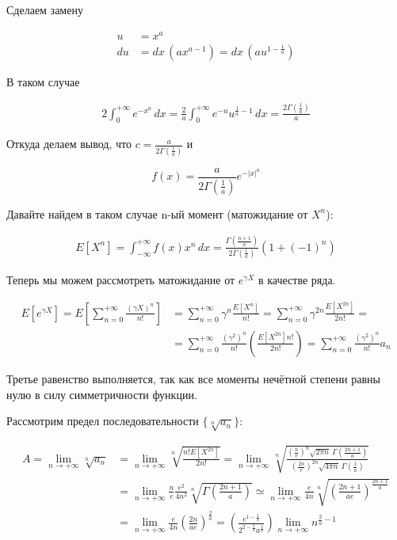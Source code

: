 \documentclass[12pt, a4paper]{article}
\theoremstyle{remark}
\newcommand{\expx}[1]{e^{-|x|^{#1}}}
\newcommand{\expxpoz}[1]{e^{-x^{#1}}}
\newcommand{\infint}[1]{\int_{-\infty}^{+\infty} #1 \, dx}
\newcommand{\infintpoz}[1]{\int_{0}^{+\infty} #1 \, dx}
\begin{document}
Сделаем замену

\begin{align*}
    u &= x^a \\
    du &= dx\,(a x^{a - 1}) = dx\,(a u^{1 - \frac{1}{a}})
\end{align*}

В таком случае

\begin{align*}
    2\infintpoz{\expxpoz{a}} = \frac{2}{a} \infintpoz{e^{-u}u^{\frac{1}{a} - 1}} = \frac{2\Gamma(\frac{1}{a})}{a}
\end{align*}

Откуда делаем вывод, что $c = \frac{a}{2\Gamma(\frac{1}{a})}
$ и 

$$f(x) = \frac{a}{2\Gamma(\frac{1}{a})} \expx{a}$$

Давайте найдем в таком случае n-ый момент (матожидание от $X^n$): 

\begin{align*}
    E[X^n] = \infint{f(x) x^n} = \frac{\Gamma(\frac{n + 1}{a})}{2\Gamma(\frac{1}{a})} (1 + (-1)^n)
\end{align*}

Теперь мы можем рассмотреть матожидание от $e^{\gamma X}$ в качестве ряда.

\begin{align*}
    E[e^{\gamma X}] = E\left[\sum_{n = 0}^{+\infty}\frac{(\gamma X)^n}{n!}\right] &= \sum_{n = 0}^{+\infty}\gamma^n\frac{E[X^n]}{n!} = \sum_{n = 0}^{+\infty}\gamma^{2n}\frac{E[X^{2n}]}{2n!} =\\
    &= \sum_{n = 0}^{+\infty}\frac{(\gamma^2)^{n}}{n!}\left(\frac{E[X^{2n}]n!}{2n!}\right) = \sum_{n = 0}^{+\infty}\frac{(\gamma^2)^{n}}{n!} a_n
\end{align*}

Третье равенство выполняется, так как все моменты нечётной степени равны нулю в силу симметричности функции.

Рассмотрим предел последовательности $\{\sqrt[n]{a_n}\}$:

\begin{align*}
    A = \lim_{n \to +\infty} \sqrt[n]{a_n} &= \lim_{n \to +\infty} \sqrt[n]{\frac{n! E[X^{2n}]}{2n!}} = 
    \lim_{n \to +\infty} \sqrt[n]{
        \frac{
            \left(\frac{n}{e}\right)^n \sqrt{2\pi n} \
            \Gamma\left(\frac{2n + 1}{a}\right)}{
                \left(\frac{2n}{e}\right)^{2n} \sqrt{4\pi n}\ \Gamma\left(\frac{1}{a}\right)}
        }\\
    &= \lim_{n \to +\infty} \frac{n}{e} \frac{e^2}{4n^2} \sqrt[n]{\Gamma\left(\frac{2n + 1}{a}\right)} \simeq \lim_{n \to +\infty}  \frac{e}{4n} \sqrt[n]{\left(\frac{2n + 1}{ae}\right)^{\frac{2n + 1}{a}}} \\
    &= \lim_{n \to +\infty} \frac{e}{4n} \left(\frac{2n}{ae}\right)^{\frac{2}{a}} = \left(\frac{e^{1 - \frac{2}{a}}}{2^{2 - \frac{2}{a}} a^\frac{2}{a}}\right) \lim_{n \to +\infty} n^{\frac{2}{a} - 1}
\end{align*}
\end{document}
